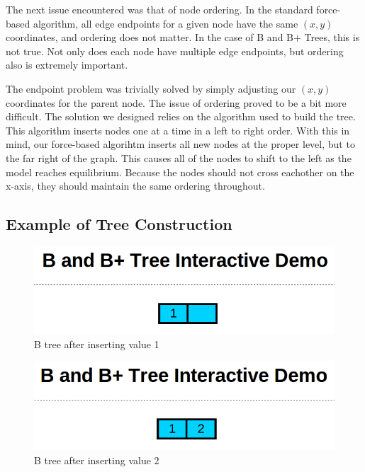 The next issue encountered was that of node ordering. In the
standard force-based algorithm, all edge endpoints for a given node
have the same $(x,y)$ coordinates, and ordering does not matter. In
the case of B and B+ Trees, this is not true. Not only does each node
have multiple edge endpoints, but ordering also is extremely
important.

The endpoint problem was trivially solved by simply adjusting our
$(x,y)$ coordinates for the parent node. The issue of ordering proved
to be a bit more difficult. The solution we designed relies on the
algorithm used to build the tree. This algorithm inserts nodes one at
a time in a left to right order. With this in mind, our force-based
algorihtm inserts all new nodes at the proper level, but to the far
right of the graph. This causes all of the nodes to shift to the left
as the model reaches equilibrium. Because the nodes should not cross
eachother on the x-axis, they should maintain the same ordering throughout.

\subsection{Example of Tree Construction}
\begin{figure}[htp]
\centering
\includegraphics[scale=0.25]{images/Insert_one.png}
\caption{B tree after inserting value 1}
\label{EX1}
\end{figure}

\begin{figure}[htp]
\centering
\includegraphics[scale=0.25]{images/Insert_two.png}
\caption{B tree after inserting value 2}
\label{EX2}
\end{figure}

